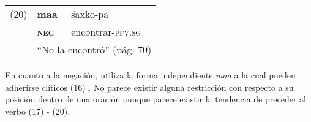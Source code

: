 {%
\begin{tabular}{lll}
(20) & \textbf{maa} & šaxko-pa \\
& \textsc{\textbf{neg}} & encontrar-\textsc{pfv.sg} \\
& \multicolumn{2}{l}{``No la encontró'' (pág. 70)}
\end{tabular} \vspace{0.5cm}

}

En cuanto a la negación, utiliza la forma independiente {\setmainfont{Charis SIL} \textit{maa}} a la cual pueden adherirse clíticos (16) \textcolor{MidnightBlue}{\citep{ChontalOaxaca}}. No parece existir alguna restricción con respecto a su posición dentro de una oración aunque parece existir la tendencia de preceder al verbo (17) - (20).
